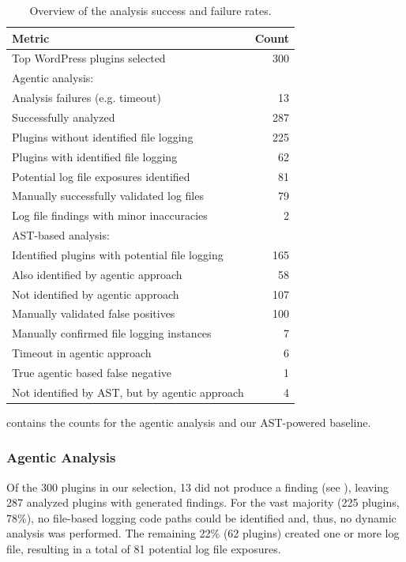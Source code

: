 \documentclass[sigconf]{acmart}
\begin{document}
\begin{table}[t]
\centering
\caption{Overview of the analysis success and failure rates.}
\label{tab:counts}
\small
\begin{tabularx}{\linewidth}{@{}Xr@{}}
\toprule
\textbf{Metric} & \textbf{Count} \\
\midrule
Top WordPress plugins selected        & 300 \\
\midrule 
Agentic analysis: & \\
\quad Analysis failures (e.g. timeout)            & 13 \\
\quad Successfully analyzed     & 287 \\
\quad\quad Plugins without identified file logging     & 225 \\
\quad\quad Plugins with identified file logging       & 62 \\
\quad\quad Potential log file exposures identified     & 81 \\
\quad\quad\quad Manually successfully validated log files & 79 \\
\quad\quad\quad Log file findings with minor inaccuracies      & 2 \\
\midrule
AST-based analysis: & \\
\quad Identified plugins with potential file logging                     & 165 \\
\quad Also identified by agentic approach       & 58 \\
\quad Not identified by agentic approach     & 107 \\
\quad\quad Manually validated false positives                & 100 \\
\quad\quad Manually confirmed file logging instances       & 7 \\
\quad\quad\quad Timeout in agentic approach       & 6 \\
\quad\quad\quad True agentic based false negative & 1 \\
\midrule
 Not identified by AST, but by agentic approach & 4 \\
\bottomrule
\end{tabularx}
\end{table}

 contains the counts for the agentic analysis and our AST-powered baseline.
\subsubsection{Agentic Analysis}
Of the 300 plugins in our selection, 13 did not produce a finding (see ), leaving 287 analyzed plugins with generated findings.
For the vast majority (225 plugins, 78\%), no file-based logging code paths could be identified and, thus, no dynamic analysis was performed.
The remaining 22\% (62 plugins) created one or more log file, resulting in a total of 81 potential log file exposures. 
\end{document}
